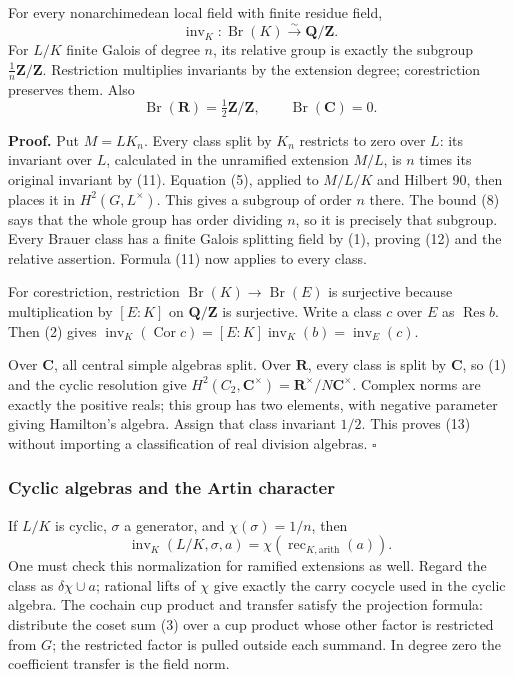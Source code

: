 \documentclass[11pt,a4paper]{article}
\begin{document}
For every nonarchimedean local field with finite residue field, \[
\operatorname{inv}_K:\operatorname{Br}(K)\xrightarrow{\sim}\mathbf Q/\mathbf Z.
\tag{12}
\] For \(L/K\) finite Galois of degree \(n\), its relative group is
exactly the subgroup \(\tfrac1n\mathbf Z/\mathbf Z\). Restriction
multiplies invariants by the extension degree; corestriction preserves
them. Also \[
\operatorname{Br}(\mathbf R)=\tfrac12\mathbf Z/\mathbf Z,
\qquad \operatorname{Br}(\mathbf C)=0.
\tag{13}
\]

\textbf{Proof.} Put \(M=LK_n\). Every class split by \(K_n\) restricts
to zero over \(L\): its invariant over \(L\), calculated in the
unramified extension \(M/L\), is \(n\) times its original invariant by
(11). Equation (5), applied to \(M/L/K\) and Hilbert 90, then places it
in \(H^2(G,L^\times)\). This gives a subgroup of order \(n\) there. The
bound (8) says that the whole group has order dividing \(n\), so it is
precisely that subgroup. Every Brauer class has a finite Galois
splitting field by (1), proving (12) and the relative assertion. Formula
(11) now applies to every class.

For corestriction, restriction
\(\operatorname{Br}(K)\to\operatorname{Br}(E)\) is surjective because
multiplication by \([E:K]\) on \(\mathbf Q/\mathbf Z\) is surjective.
Write a class \(c\) over \(E\) as \(\operatorname{Res}b\). Then (2)
gives
\(\operatorname{inv}_K(\operatorname{Cor}c)=[E:K]\operatorname{inv}_K(b)=\operatorname{inv}_E(c)\).

Over \(\mathbf C\), all central simple algebras split. Over
\(\mathbf R\), every class is split by \(\mathbf C\), so (1) and the
cyclic resolution give
\(H^2(C_2,\mathbf C^\times)=\mathbf R^\times/N\mathbf C^\times\).
Complex norms are exactly the positive reals; this group has two
elements, with negative parameter giving Hamilton's algebra. Assign that
class invariant \(1/2\). This proves (13) without importing a
classification of real division algebras. \(\square\)

\subsubsection{Cyclic algebras and the Artin
character}\label{cyclic-algebras-and-the-artin-character}

If \(L/K\) is cyclic, \(\sigma\) a generator, and \(\chi(\sigma)=1/n\),
then \[
\operatorname{inv}_K(L/K,\sigma,a)
=\chi(\operatorname{rec}_{K,\mathrm{arith}}(a)).
\tag{14}
\] One must check this normalization for ramified extensions as well.
Regard the class as \(\delta\chi\cup a\); rational lifts of \(\chi\)
give exactly the carry cocycle used in the cyclic algebra. The cochain
cup product and transfer satisfy the projection formula: distribute the
coset sum (3) over a cup product whose other factor is restricted from
\(G\); the restricted factor is pulled outside each summand. In degree
zero the coefficient transfer is the field norm.
\end{document}
